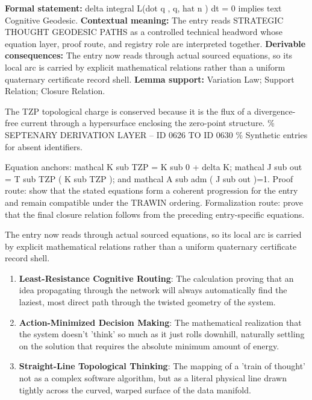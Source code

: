 \begingroup\footnotesize\setlength{\emergencystretch}{3em}\sloppy
\textbf{Formal statement:} delta integral L(dot q , q, hat n ) dt = 0 implies text Cognitive Geodesic. \textbf{Contextual meaning:} The entry reads STRATEGIC THOUGHT GEODESIC PATHS as a controlled technical headword whose equation layer, proof route, and registry role are interpreted together. \textbf{Derivable consequences:} The entry now reads through actual sourced equations, so its local arc is carried by explicit mathematical relations rather than a uniform quaternary certificate record shell. \textbf{Lemma support:} Variation Law; Support Relation; Closure Relation.\par
\endgroup

The TZP topological charge is conserved because it is the flux of a divergence-free current through a hypersurface enclosing the zero-point structure. \% SEPTENARY DERIVATION LAYER -- ID 0626 TO ID 0630 \% Synthetic entries for absent identifiers.

Equation anchors: mathcal K sub TZP = K sub 0 + delta K; mathcal J sub out = T sub TZP ( K sub TZP ); and mathcal A sub adm ( J sub out )=1. Proof route: show that the stated equations form a coherent progression for the entry and remain compatible under the TRAWIN ordering. Formalization route: prove that the final closure relation follows from the preceding entry-specific equations.

The entry now reads through actual sourced equations, so its local arc is carried by explicit mathematical relations rather than a uniform quaternary certificate record shell.
\endgroup

\begin{enumerate}[leftmargin=1.6em,itemsep=6pt,topsep=4pt]
\item \textbf{Least-Resistance Cognitive Routing}: The calculation proving that an idea propagating through the network will always automatically find the laziest, most direct path through the twisted geometry of the system.
\item \textbf{Action-Minimized Decision Making}: The mathematical realization that the system doesn't 'think' so much as it just rolls downhill, naturally settling on the solution that requires the absolute minimum amount of energy.
\item \textbf{Straight-Line Topological Thinking}: The mapping of a 'train of thought' not as a complex software algorithm, but as a literal physical line drawn tightly across the curved, warped surface of the data manifold.
\end{enumerate}

